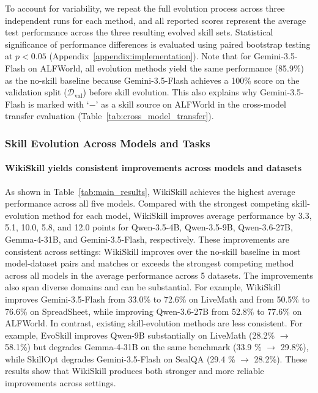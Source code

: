 \documentclass[11pt, a4paper, copyright, gr]{google}
\newcommand{\method}{WikiSkill\xspace}
\begin{document}
To account for variability, we repeat the full evolution process across three independent runs for each method, and all reported scores represent the average test performance across the three resulting evolved skill sets. Statistical significance of performance differences is evaluated using paired bootstrap testing at $p < 0.05$ (Appendix~\ref{appendix:implementation}). Note that for Gemini-3.5-Flash on ALFWorld, all evolution methods yield the same performance (85.9\%) as the no-skill baseline because Gemini-3.5-Flash achieves a 100\% score on the validation split ($\mathcal{D}_{\text{val}}$) before skill evolution. This also explains why Gemini-3.5-Flash is marked with `$-$' as a skill source on ALFWorld in the cross-model transfer evaluation (Table~\ref{tab:cross_model_transfer}).

\subsubsection{Skill Evolution Across Models and Tasks}
\vspace{-5pt}
\paragraph{\method yields consistent improvements across models and datasets} As shown in Table~\ref{tab:main_results}, \method achieves the highest average performance across all five models. Compared with the strongest competing skill-evolution method for each model, \method improves average performance by 3.3, 5.1, 10.0, 5.8, and 12.0 points for Qwen-3.5-4B, Qwen-3.5-9B, Qwen-3.6-27B, Gemma-4-31B, and Gemini-3.5-Flash, respectively. These improvements are consistent across settings: \method improves over the no-skill baseline in most model-dataset pairs and matches or exceeds the strongest competing method across all models in the average performance across 5 datasets. The improvements also span diverse domains and can be substantial. For example, \method improves Gemini-3.5-Flash from 33.0\% to 72.6\% on LiveMath and from 50.5\% to 76.6\% on SpreadSheet, while improving Qwen-3.6-27B from 52.8\% to 77.6\% on ALFWorld. In contrast, existing skill-evolution methods are less consistent. For example, EvoSkill improves Qwen-9B substantially on LiveMath (28.2\% $\rightarrow$ 58.1\%) but degrades Gemma-4-31B on the same benchmark (33.9 \% $\rightarrow$ 29.8\%), while SkillOpt degrades Gemini-3.5-Flash on SealQA (29.4 \% $\rightarrow$ 28.2\%). These results show that WikiSkill produces both stronger and more reliable improvements across settings.
\end{document}
